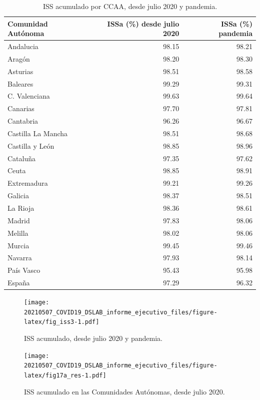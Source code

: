\documentclass[
  11pt,
]{article}
\begin{document}
\begin{table}[!h]

\caption{\label{tab:tabla}ISS acumulado por CCAA, desde julio 2020 y pandemia.}
\centering
\fontsize{9}{11}\selectfont
\begin{tabular}[t]{l|r|r}
\hline
Comunidad Autónoma & ISSa (\%) desde julio 2020 & ISSa (\%) pandemia\\
\hline
Andalucia & 98.15 & 98.21\\
\hline
Aragón & 98.20 & 98.30\\
\hline
Asturias & 98.51 & 98.58\\
\hline
Baleares & 99.29 & 99.31\\
\hline
C. Valenciana & 99.63 & 99.64\\
\hline
Canarias & 97.70 & 97.81\\
\hline
Cantabria & 96.26 & 96.67\\
\hline
Castilla La Mancha & 98.51 & 98.68\\
\hline
Castilla y León & 98.85 & 98.96\\
\hline
Cataluña & 97.35 & 97.62\\
\hline
Ceuta & 98.85 & 98.91\\
\hline
Extremadura & 99.21 & 99.26\\
\hline
Galicia & 98.37 & 98.51\\
\hline
La Rioja & 98.36 & 98.61\\
\hline
Madrid & 97.83 & 98.06\\
\hline
Melilla & 98.02 & 98.06\\
\hline
Murcia & 99.45 & 99.46\\
\hline
Navarra & 97.93 & 98.14\\
\hline
País Vasco & 95.43 & 95.98\\
\hline
España & 97.29 & 96.32\\
\hline
\end{tabular}
\end{table}

\begin{figure}
\centering
\texttt{[image: 20210507\_COVID19\_DSLAB\_informe\_ejecutivo\_files/figure-latex/fig\_iss3-1.pdf]}
\caption{\label{fig:fig_iss3} ISS acumulado, desde julio 2020 y
pandemia.}
\end{figure}

\vspace{0.2cm}

\begin{figure}
\centering
\texttt{[image: 20210507\_COVID19\_DSLAB\_informe\_ejecutivo\_files/figure-latex/fig17a\_res-1.pdf]}
\caption{\label{fig:fig17a_res} ISS acumulado en las Comunidades
Autónomas, desde julio 2020.}
\end{figure}
\end{document}
